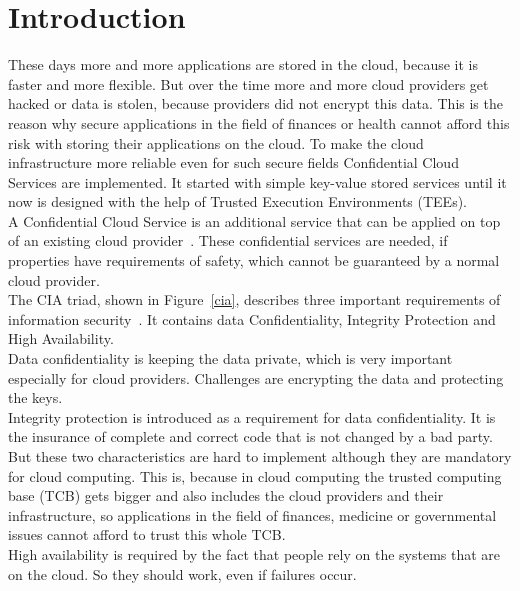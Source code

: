 \section{Introduction}
These days more and more applications are stored in the cloud, because it is faster and more flexible. %
 But over the time more and more cloud providers get hacked or data is stolen, because providers did not encrypt this data. This is the reason why secure applications in the field of finances or health cannot afford this risk with storing their applications on the cloud. To make the cloud infrastructure more reliable even for such secure fields Confidential Cloud Services are implemented. It started with simple key-value stored services until it now is designed with the help of Trusted Execution Environments (TEEs). \\
 A Confidential Cloud Service is an additional service that can be applied on top of an existing cloud provider~\cite{confidentiality}. These confidential services are needed, if properties have requirements of safety, which cannot be guaranteed by a normal cloud provider.   \\
 The CIA triad,  shown in Figure~\ref{cia},  describes three important requirements of information security~\cite{ciaBook, cia}. It contains data Confidentiality, Integrity Protection and High Availability.\\
 Data confidentiality is keeping the data private, which is very important especially for cloud providers. Challenges are encrypting the data and protecting the keys.\\
 Integrity protection is introduced as a requirement for data confidentiality. It is the insurance of complete and correct code that is not changed by a bad party. But these two characteristics are hard to implement although they are mandatory for cloud computing. This is, because in cloud computing the trusted computing base (TCB) gets bigger and also includes the cloud providers and their infrastructure, so applications in the field of finances, medicine or governmental issues cannot afford to trust this whole TCB.\\
 High availability is required by the fact that people rely on the systems that are on the cloud. So they should work, even if failures occur.\\
	 